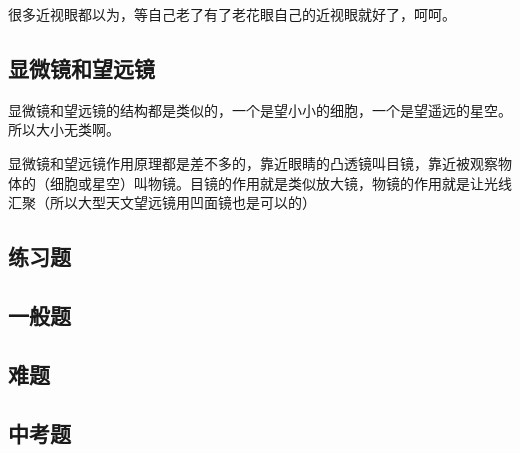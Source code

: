 \documentclass[12pt]{exam}
\begin{document}
很多近视眼都以为，等自己老了有了老花眼自己的近视眼就好了，呵呵。


\subsection{显微镜和望远镜}
显微镜和望远镜的结构都是类似的，一个是望小小的细胞，一个是望遥远的星空。所以大小无类啊。

显微镜和望远镜作用原理都是差不多的，靠近眼睛的凸透镜叫目镜，靠近被观察物体的（细胞或星空）叫物镜。目镜的作用就是类似放大镜，物镜的作用就是让光线汇聚（所以大型天文望远镜用凹面镜也是可以的）



\begin{Aquestions}
\newpage
\section{练习题}

\end{Aquestions}


\begin{Bquestions}
\newpage
\section{一般题}
\end{Bquestions}




\begin{Cquestions}
\newpage
\section{难题}
\end{Cquestions}



\begin{Dquestions}
\newpage
\section{中考题}
\end{Dquestions}




%
\end{document}
